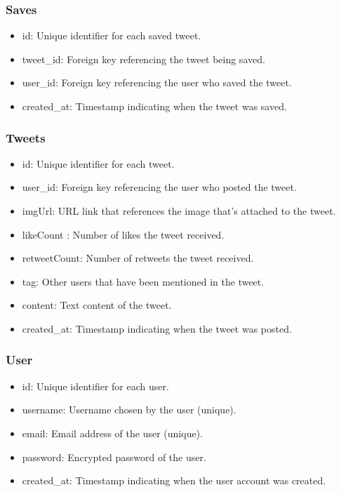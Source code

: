 \documentclass{article}
\begin{document}
\subsubsection{Saves}
\begin{itemize}
    \item id: Unique identifier for each saved tweet.
    \item tweet\_id: Foreign key referencing the tweet being saved.
    \item user\_id: Foreign key referencing the user who saved the tweet.
    \item created\_at: Timestamp indicating when the tweet was saved.
\end{itemize}

\subsubsection{Tweets}
\begin{itemize}
    \item id: Unique identifier for each tweet.
    \item user\_id: Foreign key referencing the user who posted the tweet.
    \item imgUrl: URL link that references the image that's attached to the tweet.
    \item likeCount : Number of likes the tweet received.
    \item retweetCount: Number of retweets the tweet received.
    \item tag: Other users that have been mentioned in the tweet.
    \item content: Text content of the tweet.
    \item created\_at: Timestamp indicating when the tweet was posted.
\end{itemize}

\subsubsection{User}
\begin{itemize}
    \item id: Unique identifier for each user.
    \item username: Username chosen by the user (unique).
    \item email: Email address of the user (unique).
    \item password: Encrypted password of the user.
    \item created\_at: Timestamp indicating when the user account was created.
\end{itemize}
\end{document}
